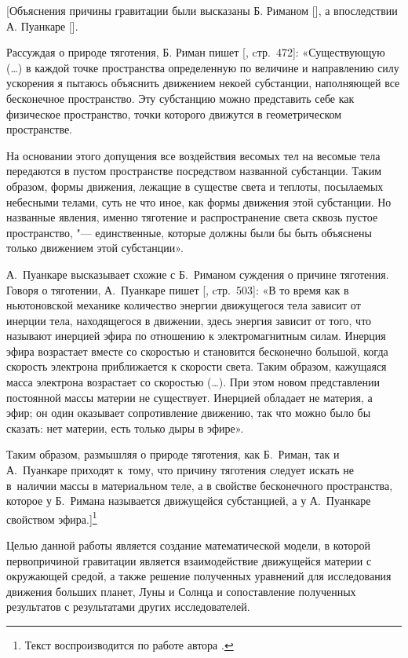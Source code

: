 [Объяснения причины гравитации были высказаны Б. Риманом [], а впоследствии А. Пуанкаре [].

Рассуждая о природе тяготения, Б. Риман пишет [, cтр.~472]: «Существующую (\dots) в каждой точке пространства определенную по величине и направлению силу ускорения я пытаюсь объяснить движением некоей субстанции,
наполняющей все бесконечное пространство. Эту субстанцию можно представить себе как физическое пространство, точки которого движутся в геометрическом пространстве.

На основании этого допущения все воздействия весомых тел на весомые
тела передаются в пустом пространстве посредством названной субстанции.
Таким образом, формы движения, лежащие в существе света и теплоты, посылаемых небесными телами, суть не что иное, как формы движения этой
субстанции. Но названные явления, именно тяготение и распространение света сквозь пустое пространство, "--- единственные, которые должны были бы
быть объяснены только движением этой субстанции».

А.~Пуанкаре высказывает схожие с Б.~Риманом суждения о причине тяготения. Говоря о тяготении, А.~Пуанкаре пишет [, cтр.~503]: «В то время как
в ньютоновской механике количество энергии движущегося тела зависит от
инерции тела, находящегося в движении, здесь энергия зависит от того, что
называют инерцией эфира по отношению к электромагнитным силам. Инерция эфира возрастает вместе со скоростью и становится бесконечно большой,
когда скорость электрона приближается к скорости света. Таким образом,
кажущаяся масса электрона возрастает со скоростью (\dots). При этом новом
представлении постоянной массы материи не существует. Инерцией обладает
не материя, а эфир; он один оказывает сопротивление движению, так что
можно было бы сказать: нет материи, есть только дыры в эфире».

Таким образом, размышляя о природе тяготения, как Б.~Риман, так и А.~Пуанкаре приходят к~тому, что причину тяготения следует искать не в~наличии массы в материальном теле, а в свойстве бесконечного пространства,
которое у Б.~Римана называется движущейся субстанцией, а у А.~Пуанкаре
свойством эфира.]\footnote{Текст воспроизводится  по работе автора \cite{zaus:11}.}

Целью данной работы является создание математической модели, в которой первопричиной гравитации является взаимодействие движущейся материи с окружающей средой, а также решение полученных уравнений для исследования движения больших планет, Луны и Солнца и сопоставление полученных результатов с результатами других исследователей.


